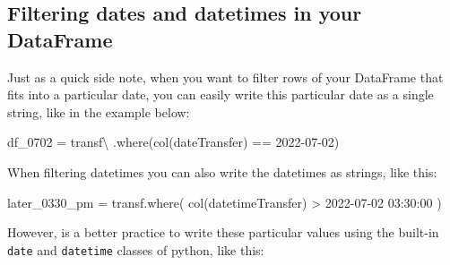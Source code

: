 \documentclass[
  11pt,
  letterpaper,
  DIV=11,
  numbers=noendperiod]{scrreprt}
\newenvironment{Shaded}{\begin{snugshade}}{\end{snugshade}}
\newcommand{\NormalTok}[1]{\textcolor[rgb]{0.00,0.23,0.31}{#1}}
\newcommand{\OperatorTok}[1]{\textcolor[rgb]{0.37,0.37,0.37}{#1}}
\newcommand{\StringTok}[1]{\textcolor[rgb]{0.13,0.47,0.30}{#1}}
\begin{document}
\hypertarget{filtering-dates-and-datetimes-in-your-dataframe}{%
\subsection{Filtering dates and datetimes in your
DataFrame}\label{filtering-dates-and-datetimes-in-your-dataframe}}

Just as a quick side note, when you want to filter rows of your
DataFrame that fits into a particular date, you can easily write this
particular date as a single string, like in the example below:

\begin{Shaded}
\begin{Highlighting}[]
\NormalTok{df\_0702 }\OperatorTok{=}\NormalTok{ transf}\OperatorTok{\textbackslash{}}
\NormalTok{  .where(col(}\StringTok{\textquotesingle{}dateTransfer\textquotesingle{}}\NormalTok{) }\OperatorTok{==} \StringTok{\textquotesingle{}2022{-}07{-}02\textquotesingle{}}\NormalTok{)}
\end{Highlighting}
\end{Shaded}

When filtering datetimes you can also write the datetimes as strings,
like this:

\begin{Shaded}
\begin{Highlighting}[]
\NormalTok{later\_0330\_pm }\OperatorTok{=}\NormalTok{ transf.where(}
\NormalTok{    col(}\StringTok{\textquotesingle{}datetimeTransfer\textquotesingle{}}\NormalTok{) }\OperatorTok{\textgreater{}} \StringTok{\textquotesingle{}2022{-}07{-}02 03:30:00\textquotesingle{}}
\NormalTok{)}
\end{Highlighting}
\end{Shaded}

However, is a better practice to write these particular values using the
built-in \texttt{date} and \texttt{datetime} classes of python, like
this:
\end{document}
